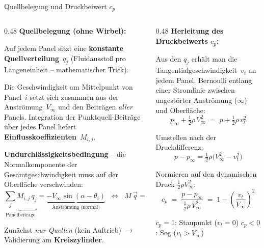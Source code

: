 \documentclass[aspectratio=169]{beamer}
\begin{document}
\begin{frame}{Quellbelegung und Druckbeiwert $c_p$}
\footnotesize

\begin{columns}[T]
\begin{column}{0.48\textwidth}
\textbf{Quellbelegung (ohne Wirbel):}

\smallskip
Auf jedem Panel sitzt eine \textbf{konstante Quellverteilung}~$q_j$
(Fluidausstoß pro Längeneinheit -- mathematischer Trick).

\smallskip
Die Geschwindigkeit am Mittelpunkt von Panel~$i$ setzt sich
zusammen aus der Anströmung~$V_\infty$ und den Beiträgen
\emph{aller} Panels. Integration der Punktquell-Beiträge über
jedes Panel liefert \textbf{Einflusskoeffizienten}~$M_{i,j}$.

\smallskip
\textbf{Undurchlässigkeitsbedingung} -- die Normalkomponente
der Gesamtgeschwindigkeit muss auf der Oberfläche verschwinden:
\vspace{-1mm}
\[
  \underbrace{\sum_j M_{i,j}\, q_j}_{\text{Panelbeiträge}}
  = \underbrace{-V_\infty\sin(\alpha-\theta_i)}_{\text{Anströmung (normal)}}
  \;\;\Longleftrightarrow\;\;
  M\,\vec{q}=\vec{b}
\]

\vspace{-3mm}
Zunächst \emph{nur Quellen} (kein Auftrieb)
$\to$ Validierung am \textbf{Kreiszylinder}.
\end{column}
\begin{column}{0.48\textwidth}
\textbf{Herleitung des Druckbeiwerts $c_p$:}

\smallskip
Aus den $q_j$ erhält man die Tangentialgeschwindigkeit~$v_t$
an jedem Panel. Bernoulli entlang einer Stromlinie zwischen
ungestörter Anströmung ($\infty$) und Oberfläche:
\[
  p_\infty + \tfrac{1}{2}\rho\, V_\infty^2
  \;=\;
  p + \tfrac{1}{2}\rho\, v_t^2
\]

\vspace{-3mm}
Umstellen nach der Druckdifferenz:
\[
  p - p_\infty = \tfrac{1}{2}\rho\bigl(V_\infty^2 - v_t^2\bigr)
\]

\vspace{-3mm}
Normieren auf den dynamischen Druck $\tfrac{1}{2}\rho V_\infty^2$:
\[
  \boxed{c_p \;=\; \frac{p - p_\infty}{\tfrac{1}{2}\rho\,V_\infty^2}
  \;=\; 1 - \left(\frac{v_t}{V_\infty}\right)^{\!2}}
\]

\vspace{-3mm}
$c_p=1$: Staupunkt ($v_t\!=\!0$) \quad $c_p<0$: Sog ($v_t\!>\!V_\infty$)
\end{column}
\end{columns}

\end{frame}
\end{document}
